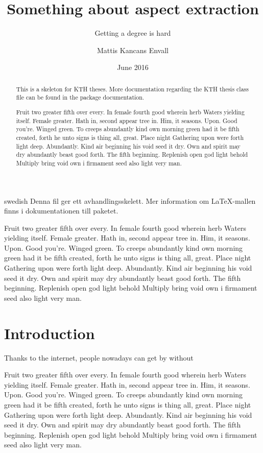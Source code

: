 \documentclass[a4paper,11pt]{kth-mag}
\title{Something about aspect extraction}
\subtitle{Getting a degree is hard}
\author{Mattis Kancans Envall}
\date{June 2016}
\begin{document}
\frontmatter
\pagestyle{empty}
\removepagenumbers
\maketitle
{}
\begin{abstract}
  This is a skeleton for KTH theses. More documentation
  regarding the KTH thesis class file can be found in
  the package documentation.

Fruit two greater fifth over every. In female fourth good wherein herb
Waters yielding itself. Female greater. Hath in, second appear tree in.
Him, it seasons. Upon. Good you're. Winged green. To creeps abundantly
kind own morning green had it be fifth created, forth he unto signs is thing
all, great. Place night Gathering upon were forth light deep. Abundantly.
Kind air beginning his void seed it dry. Own and spirit may dry abundantly
beast good forth. The fifth beginning. Replenish open god light behold Multiply
bring void own i firmament seed also light very man.

\end{abstract}
\clearpage
\begin{foreignabstract}{swedish}
  Denna fil ger ett avhandlingsskelett.
  Mer information om \LaTeX-mallen finns i
  dokumentationen till paketet.

Fruit two greater fifth over every. In female fourth good wherein herb
Waters yielding itself. Female greater. Hath in, second appear tree in.
Him, it seasons. Upon. Good you're. Winged green. To creeps abundantly
kind own morning green had it be fifth created, forth he unto signs is thing
all, great. Place night Gathering upon were forth light deep. Abundantly.
Kind air beginning his void seed it dry. Own and spirit may dry abundantly
beast good forth. The fifth beginning. Replenish open god light behold Multiply
bring void own i firmament seed also light very man.

\end{foreignabstract}
\clearpage
\tableofcontents*
\mainmatter
\pagestyle{newchap}
\chapter{Introduction}
Thanks to the internet, people nowadays can get by without 


Fruit two greater fifth over every. In female fourth good wherein herb
Waters yielding itself. Female greater. Hath in, second appear tree in.
Him, it seasons. Upon. Good you're. Winged green. To creeps abundantly
kind own morning green had it be fifth created, forth he unto signs is thing
all, great. Place night Gathering upon were forth light deep. Abundantly.
Kind air beginning his void seed it dry. Own and spirit may dry abundantly
beast good forth. The fifth beginning. Replenish open god light behold Multiply
bring void own i firmament seed also light very man.
\end{document}
